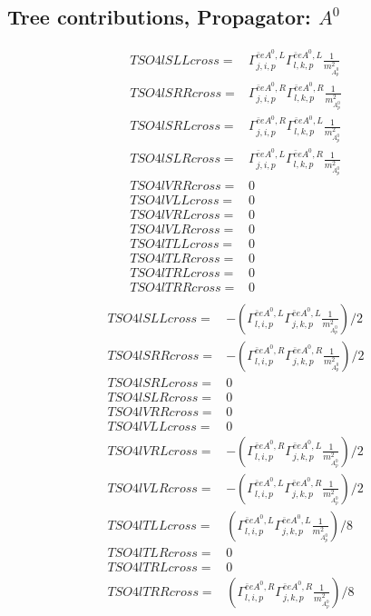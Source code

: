 \documentclass[A4,landscape]{article}
\begin{document}
\subsection{Tree contributions, Propagator: $A^0$} 

\begin{align} 
  TSO4lSLLcross= & \Gamma^{\bar{e}e A^0 ,L}_{j, i, p} \Gamma^{\bar{e}e A^0 ,L}_{l, k, p} \frac{1}{m^2_{A^0_{{p}}}} \\ 
  TSO4lSRRcross= & \Gamma^{\bar{e}e A^0 ,R}_{j, i, p} \Gamma^{\bar{e}e A^0 ,R}_{l, k, p} \frac{1}{m^2_{A^0_{{p}}}} \\ 
  TSO4lSRLcross= & \Gamma^{\bar{e}e A^0 ,R}_{j, i, p} \Gamma^{\bar{e}e A^0 ,L}_{l, k, p} \frac{1}{m^2_{A^0_{{p}}}} \\ 
  TSO4lSLRcross= & \Gamma^{\bar{e}e A^0 ,L}_{j, i, p} \Gamma^{\bar{e}e A^0 ,R}_{l, k, p} \frac{1}{m^2_{A^0_{{p}}}} \\ 
  TSO4lVRRcross= & 0 \\ 
  TSO4lVLLcross= & 0 \\ 
  TSO4lVRLcross= & 0 \\ 
  TSO4lVLRcross= & 0 \\ 
  TSO4lTLLcross= & 0 \\ 
  TSO4lTLRcross= & 0 \\ 
  TSO4lTRLcross= & 0 \\ 
  TSO4lTRRcross= & 0 \\ 
\end{align} 
\begin{align} 
  TSO4lSLLcross= & -(\Gamma^{\bar{e}e A^0 ,L}_{l, i, p} \Gamma^{\bar{e}e A^0 ,L}_{j, k, p} \frac{1}{m^2_{A^0_{{p}}}})/2 \\ 
  TSO4lSRRcross= & -(\Gamma^{\bar{e}e A^0 ,R}_{l, i, p} \Gamma^{\bar{e}e A^0 ,R}_{j, k, p} \frac{1}{m^2_{A^0_{{p}}}})/2 \\ 
  TSO4lSRLcross= & 0 \\ 
  TSO4lSLRcross= & 0 \\ 
  TSO4lVRRcross= & 0 \\ 
  TSO4lVLLcross= & 0 \\ 
  TSO4lVRLcross= & -(\Gamma^{\bar{e}e A^0 ,R}_{l, i, p} \Gamma^{\bar{e}e A^0 ,L}_{j, k, p} \frac{1}{m^2_{A^0_{{p}}}})/2 \\ 
  TSO4lVLRcross= & -(\Gamma^{\bar{e}e A^0 ,L}_{l, i, p} \Gamma^{\bar{e}e A^0 ,R}_{j, k, p} \frac{1}{m^2_{A^0_{{p}}}})/2 \\ 
  TSO4lTLLcross= & (\Gamma^{\bar{e}e A^0 ,L}_{l, i, p} \Gamma^{\bar{e}e A^0 ,L}_{j, k, p} \frac{1}{m^2_{A^0_{{p}}}})/8 \\ 
  TSO4lTLRcross= & 0 \\ 
  TSO4lTRLcross= & 0 \\ 
  TSO4lTRRcross= & (\Gamma^{\bar{e}e A^0 ,R}_{l, i, p} \Gamma^{\bar{e}e A^0 ,R}_{j, k, p} \frac{1}{m^2_{A^0_{{p}}}})/8 \\ 
\end{align} 
\end{document}

